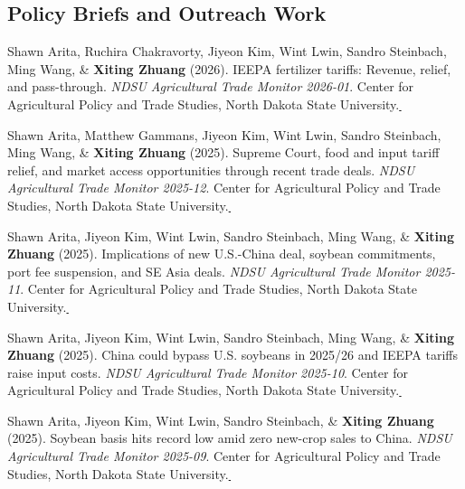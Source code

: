 \documentclass[10.8 pt,letterpaper]{article}
\newcommand{\paperlink}[1]{\href{#1}{\,\small\faExternalLink}}
\renewenvironment{itemize}{
	\begin{list}{}{
			\setlength{\leftmargin}{1.5em}
		}
	}{
	\end{list}
}
\begin{document}
	
	\subsection*{\textbf{Policy Briefs and Outreach Work}}
	\begin{itemize}
		
		\item[-] Shawn Arita, Ruchira Chakravorty, Jiyeon Kim, Wint Lwin, Sandro Steinbach, Ming Wang, \& \textbf{Xiting Zhuang} (2026). IEEPA fertilizer tariffs: Revenue, relief, and pass-through. \textit{NDSU Agricultural Trade Monitor 2026-01}. Center for Agricultural Policy and Trade Studies, North Dakota State University.\paperlink{https://www.capts-ndsu.com/_files/ugd/3c6228_df79f1f42b5f4d98a0428a2c43085b98.pdf}
		
		\item[-] Shawn Arita, Matthew Gammans, Jiyeon Kim, Wint Lwin, Sandro Steinbach, Ming Wang, \& \textbf{Xiting Zhuang} (2025). Supreme Court, food and input tariff relief, and market access opportunities through recent trade deals. \textit{NDSU Agricultural Trade Monitor 2025-12}. Center for Agricultural Policy and Trade Studies, North Dakota State University.\paperlink{https://www.capts-ndsu.com/_files/ugd/3c6228_c0952c30cd4848a7b76fead0aed0853e.pdf}
		
		\item[-] Shawn Arita, Jiyeon Kim, Wint Lwin, Sandro Steinbach, Ming Wang, \& \textbf{Xiting Zhuang} (2025). Implications of new U.S.-China deal, soybean commitments, port fee suspension, and SE Asia deals. \textit{NDSU Agricultural Trade Monitor 2025-11}. Center for Agricultural Policy and Trade Studies, North Dakota State University.\paperlink{https://www.capts-ndsu.com/_files/ugd/3c6228_26d85e314b884039ac6aa9f2d9b3b739.pdf}
		
		\item[-] Shawn Arita, Jiyeon Kim, Wint Lwin, Sandro Steinbach, Ming Wang, \& \textbf{Xiting Zhuang} (2025). China could bypass U.S. soybeans in 2025/26 and IEEPA tariffs raise input costs. \textit{NDSU Agricultural Trade Monitor 2025-10}. Center for Agricultural Policy and Trade Studies, North Dakota State University.\paperlink{https://www.capts-ndsu.com/_files/ugd/3c6228_8ba2525b1280446489c686bb8f45bef1.pdf}
		
		\item[-] Shawn Arita, Jiyeon Kim, Wint Lwin, Sandro Steinbach, \& \textbf{Xiting Zhuang} (2025). Soybean basis hits record low amid zero new-crop sales to China. \textit{NDSU Agricultural Trade Monitor 2025-09}. Center for Agricultural Policy and Trade Studies, North Dakota State University.\paperlink{https://www.capts-ndsu.com/_files/ugd/3c6228_a43f5e48de2d400f88da267c58abfc6f.pdf}
		

\end{itemize}
\end{document}
